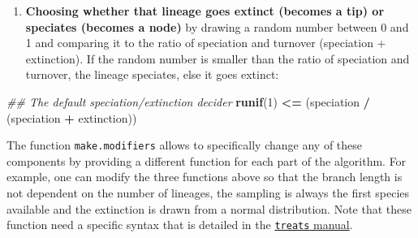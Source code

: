 \documentclass[
]{article}
\newenvironment{Shaded}{\begin{snugshade}}{\end{snugshade}}
\newcommand{\CommentTok}[1]{\textcolor[rgb]{0.56,0.35,0.01}{\textit{#1}}}
\newcommand{\DecValTok}[1]{\textcolor[rgb]{0.00,0.00,0.81}{#1}}
\newcommand{\KeywordTok}[1]{\textcolor[rgb]{0.13,0.29,0.53}{\textbf{#1}}}
\newcommand{\NormalTok}[1]{#1}
\newcommand{\OperatorTok}[1]{\textcolor[rgb]{0.81,0.36,0.00}{\textbf{#1}}}
\newcommand{\StringTok}[1]{\textcolor[rgb]{0.31,0.60,0.02}{#1}}
\providecommand{\tightlist}{%
  \setlength{\itemsep}{0pt}\setlength{\parskip}{0pt}}
\begin{document}
\begin{enumerate}
\def\labelenumi{\arabic{enumi}.}
\setcounter{enumi}{2}
\tightlist
\item
  \textbf{Choosing whether that lineage goes extinct (becomes a tip) or
  speciates (becomes a node)} by drawing a random number between 0 and 1
  and comparing it to the ratio of speciation and turnover (speciation +
  extinction). If the random number is smaller than the ratio of
  speciation and turnover, the lineage speciates, else it goes extinct:
\end{enumerate}

\begin{Shaded}
\begin{Highlighting}[]
\CommentTok{\#\# The default speciation/extinction decider}
\KeywordTok{runif}\NormalTok{(}\DecValTok{1}\NormalTok{) }\OperatorTok{\textless{}=}\StringTok{ }\NormalTok{(speciation }\OperatorTok{/}\StringTok{ }\NormalTok{(speciation }\OperatorTok{+}\StringTok{ }\NormalTok{extinction))}
\end{Highlighting}
\end{Shaded}

The function \texttt{make.modifiers} allows to specifically change any
of these components by providing a different function for each part of
the algorithm. For example, one can modify the three functions above so
that the branch length is not dependent on the number of lineages, the
sampling is always the first species available and the extinction is
drawn from a normal distribution. Note that these function need a
specific syntax that is detailed in the
\href{http://tguillerme.github.io/treats.html}{\texttt{treats} manual}.
\end{document}
